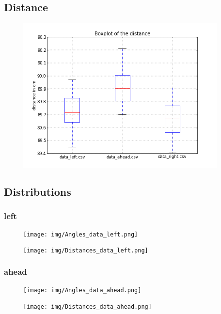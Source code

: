 \documentclass{scrartcl}
\begin{document}
\subsection{Distance}
\begin{figure}[H]
  \centering
  \includegraphics[width=0.5\linewidth]{img/BoxplotDistance.png}
\end{figure}

\subsection{Distributions}

\subsubsection{left}
\begin{figure}[H]
\centering
\begin{minipage}{.5\textwidth}
  \centering
  \texttt{[image: img/Angles\_data\_left.png]}
\end{minipage}%
\begin{minipage}{.5\textwidth}
  \centering
  \texttt{[image: img/Distances\_data\_left.png]}
\end{minipage}
\end{figure}


\subsubsection{ahead}
\begin{figure}[H]
\centering
\begin{minipage}{.5\textwidth}
  \centering
  \texttt{[image: img/Angles\_data\_ahead.png]}
\end{minipage}%
\begin{minipage}{.5\textwidth}
  \centering
  \texttt{[image: img/Distances\_data\_ahead.png]}
\end{minipage}
\end{figure}
\end{document}
